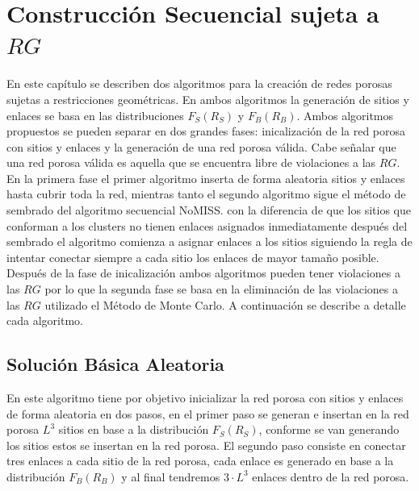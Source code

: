 \chapter{Construcción Secuencial sujeta a $RG$}
\label{champ:BSGR}
\bigskip
\barra
\bigskip

En este capítulo se describen dos algoritmos para la creación de redes porosas sujetas a restricciones geométricas. En ambos algoritmos la generación de sitios y enlaces se basa en las distribuciones $F_S(R_S)$ y $F_B(R_B)$. Ambos algoritmos propuestos se pueden separar en dos grandes fases: inicalizaci\'on de la red porosa con sitios y enlaces y la generación de una red porosa v\'alida. Cabe señalar que una red porosa v\'alida es aquella que se encuentra libre de violaciones a las $RG$. En la primera fase el primer algoritmo inserta de forma aleatoria sitios y enlaces hasta cubrir toda la red, mientras tanto el segundo algoritmo sigue el método de sembrado del algoritmo secuencial NoMISS. con la diferencia de que los sitios que conforman a los clusters no tienen enlaces asignados inmediatamente después del sembrado el algoritmo comienza a asignar enlaces a los sitios siguiendo la regla de intentar conectar siempre a cada sitio los enlaces de mayor tamaño posible. Después de la fase de inicalizaci\'on ambos algoritmos pueden tener violaciones a las $RG$ por lo que la segunda fase se basa en la eliminaci\'on de las violaciones a las $RG$ utilizado el Método de Monte Carlo. A continuación se describe a detalle cada algoritmo.

\section{Solución Básica Aleatoria}
\label{sec:smcrg}
En este algoritmo tiene por objetivo inicializar la red porosa con sitios y enlaces de forma aleatoria en dos pasos, en el primer paso se generan e insertan en la red porosa $L^3$ sitios en base a la distribución $F_S(R_S)$, conforme se van generando los sitios estos se insertan en la red porosa. El segundo paso consiste en conectar tres enlaces a cada sitio de la red porosa, cada enlace es generado en base a la distribución $F_B(R_B)$ y al final tendremos $3 \cdot L^3$ enlaces dentro de la red porosa.\\

